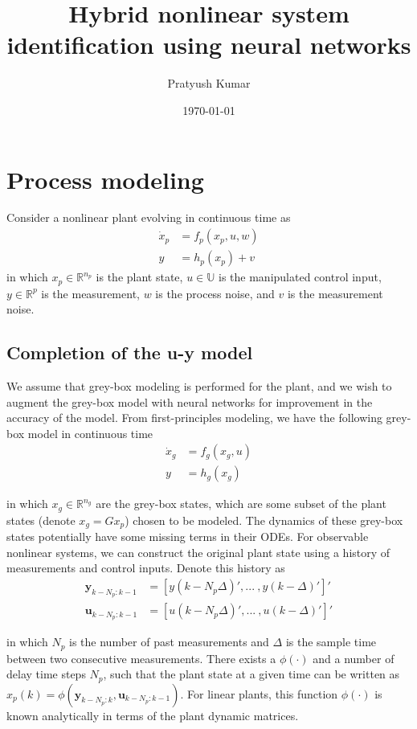 \documentclass{article}
\title{Hybrid nonlinear system identification using neural networks}
\author{Pratyush Kumar}
\date{\today}
\newcommand{\bbR}{\mathbb{R}}
\newcommand{\bbU}{\mathbb{U}}
\begin{document}
\maketitle

\section{Process modeling}
Consider a nonlinear plant evolving in continuous time as
\begin{align*}
  \dot{x}_p &= f_p(x_p, u, w) \\
  y &= h_p(x_p) + v
\end{align*}
in which $x_p \in \bbR^{n_p}$ is the plant state, 
$u \in \bbU$ is the manipulated control input,
$y \in \bbR^p$ is the measurement, $w$ is the process noise, 
and $v$ is the measurement noise.

\subsection{Completion of the u-y model}
We assume that grey-box modeling is performed 
for the plant, and we wish to augment the grey-box model with neural networks
for improvement in the accuracy of the model. From first-principles modeling, 
we have the following grey-box model in continuous time
\begin{align*}
  \dot{x}_g &= f_g(x_g, u) \\
  y &= h_g(x_g)
\end{align*}

in which $x_g \in \bbR^{n_g}$ are the grey-box states, 
which are some subset 
of the plant states (denote $x_g = Gx_p$) chosen to 
be modeled. The dynamics of these grey-box states 
potentially have some missing terms 
in their ODEs.
For observable nonlinear systems, 
we can construct the original plant state
using a history of measurements and control inputs.
Denote this history as 
\begin{align*}
  \mathbf{y}_{k-N_p:k-1} &= [y(k-N_p\Delta)', ... \ , y(k-\Delta)']' \\
  \mathbf{u}_{k-N_p:k-1} &= [u(k-N_p\Delta)', 
                               ... \ , u(k-\Delta)']'
\end{align*}

in which $N_p$ is the number of 
past measurements and
$\Delta$ is the sample time between two consecutive
measurements. There exists a $\phi(\cdot)$ 
and a number of delay 
time steps $N_p$, such that the plant state
at a given time can be written as
$x_p(k) = \phi(\mathbf{y}_{k-N_p:k}, \mathbf{u}_{k-N_p:k-1})$.
For linear plants, this function $\phi(\cdot)$
is known analytically in terms of the plant dynamic
matrices.
\end{document}
